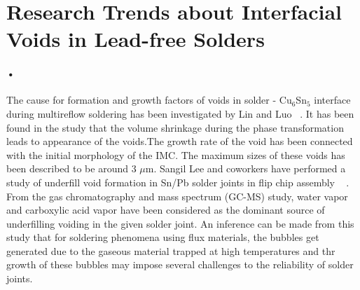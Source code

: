 \section{Research Trends about Interfacial Voids in Lead-free Solders}
\paragraph*{•}
The cause for formation and growth factors of voids in solder - Cu$_6$Sn$_5$ interface during multireflow soldering has been investigated by Lin and Luo ~\cite{XLin2007}. It has been found in the study that the volume shrinkage during the phase transformation leads to appearance of the voids.The growth rate of the void has been connected with the initial morphology of the IMC. The maximum sizes of these voids has been described to be around 3 $\mu$m. Sangil Lee and coworkers  have performed a study of underfill void formation in Sn/Pb solder joints in flip chip assembly ~\cite{SLee2009thesis}\cite{SLee2009JEP}\cite{SLee2010} \cite{SLee2012}. From the gas chromatography and mass spectrum (GC-MS) study, water vapor and carboxylic acid vapor have been considered as the dominant source of underfilling voiding in the given solder joint. An inference can be made from this study that for soldering phenomena using flux materials, the bubbles get generated due to the gaseous material trapped at high temperatures and thr growth of these bubbles may impose several challenges to the reliability of solder joints. 
